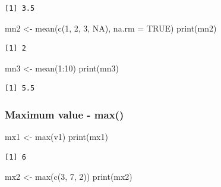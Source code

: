 \documentclass[
  letterpaper,
  DIV=11,
  numbers=noendperiod]{scrartcl}
\newenvironment{Shaded}{\begin{snugshade}}{\end{snugshade}}
\newcommand{\AttributeTok}[1]{\textcolor[rgb]{0.40,0.45,0.13}{#1}}
\newcommand{\ConstantTok}[1]{\textcolor[rgb]{0.56,0.35,0.01}{#1}}
\newcommand{\DecValTok}[1]{\textcolor[rgb]{0.68,0.00,0.00}{#1}}
\newcommand{\FunctionTok}[1]{\textcolor[rgb]{0.28,0.35,0.67}{#1}}
\newcommand{\NormalTok}[1]{\textcolor[rgb]{0.00,0.23,0.31}{#1}}
\newcommand{\OtherTok}[1]{\textcolor[rgb]{0.00,0.23,0.31}{#1}}
\newcommand{\SpecialCharTok}[1]{\textcolor[rgb]{0.37,0.37,0.37}{#1}}
\begin{document}
\begin{verbatim}
[1] 3.5
\end{verbatim}

\begin{Shaded}
\begin{Highlighting}[]
\NormalTok{mn2 }\OtherTok{\textless{}{-}} \FunctionTok{mean}\NormalTok{(}\FunctionTok{c}\NormalTok{(}\DecValTok{1}\NormalTok{, }\DecValTok{2}\NormalTok{, }\DecValTok{3}\NormalTok{, }\ConstantTok{NA}\NormalTok{), }\AttributeTok{na.rm =} \ConstantTok{TRUE}\NormalTok{)}
\FunctionTok{print}\NormalTok{(mn2)}
\end{Highlighting}
\end{Shaded}

\begin{verbatim}
[1] 2
\end{verbatim}

\begin{Shaded}
\begin{Highlighting}[]
\NormalTok{mn3 }\OtherTok{\textless{}{-}} \FunctionTok{mean}\NormalTok{(}\DecValTok{1}\SpecialCharTok{:}\DecValTok{10}\NormalTok{)}
\FunctionTok{print}\NormalTok{(mn3)}
\end{Highlighting}
\end{Shaded}

\begin{verbatim}
[1] 5.5
\end{verbatim}

\subsubsection{Maximum value - max()}\label{maximum-value---max}

\begin{Shaded}
\begin{Highlighting}[]
\NormalTok{mx1 }\OtherTok{\textless{}{-}} \FunctionTok{max}\NormalTok{(v1)}
\FunctionTok{print}\NormalTok{(mx1)}
\end{Highlighting}
\end{Shaded}

\begin{verbatim}
[1] 6
\end{verbatim}

\begin{Shaded}
\begin{Highlighting}[]
\NormalTok{mx2 }\OtherTok{\textless{}{-}} \FunctionTok{max}\NormalTok{(}\FunctionTok{c}\NormalTok{(}\DecValTok{3}\NormalTok{, }\DecValTok{7}\NormalTok{, }\DecValTok{2}\NormalTok{))}
\FunctionTok{print}\NormalTok{(mx2)}
\end{Highlighting}
\end{Shaded}
\end{document}
